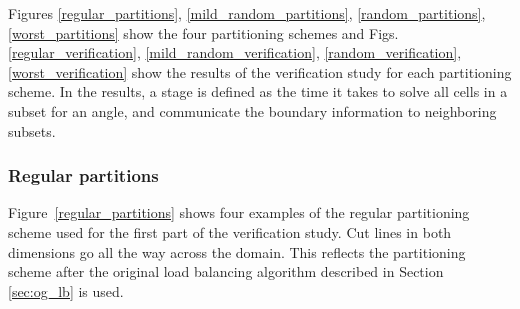 \documentclass[times,final]{elsarticle}
\begin{document}
Figures \ref{regular_partitions}, \ref{mild_random_partitions}, \ref{random_partitions}, \ref{worst_partitions} show the four partitioning schemes and Figs. \ref{regular_verification}, \ref{mild_random_verification}, \ref{random_verification}, \ref{worst_verification} show the results of the verification study for each partitioning scheme. In the results, a stage is defined as the time it takes to solve all cells in a subset for an angle, and communicate the boundary information to neighboring subsets.

\subsubsection{Regular partitions}

Figure~\ref{regular_partitions} shows four examples of the regular partitioning scheme used for the first part of the verification study. Cut lines in both dimensions go all the way across the domain. This reflects the partitioning scheme after the original load balancing algorithm described in Section \ref{sec:og_lb} is used.
\end{document}
